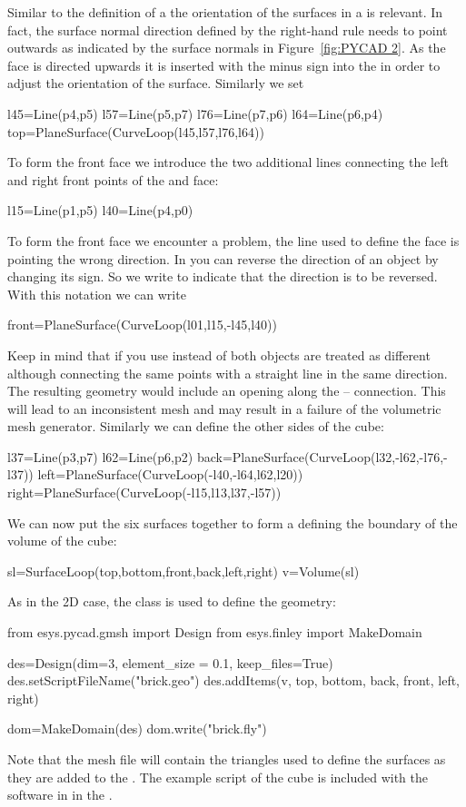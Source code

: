Similar to the definition of a  the orientation of the
surfaces in a  is relevant.
In fact, the surface normal direction defined by the right-hand rule needs to
point outwards as indicated by the surface normals in Figure~\ref{fig:PYCAD 2}.
As the  face is directed upwards it is inserted with the minus
sign into the  in order to adjust the orientation of the
surface. Similarly we set 
\begin{python}
  l45=Line(p4,p5)
  l57=Line(p5,p7)
  l76=Line(p7,p6)
  l64=Line(p6,p4)
  top=PlaneSurface(CurveLoop(l45,l57,l76,l64))
\end{python}
To form the front face we introduce the two additional lines connecting the
left and right front points of the  and  face:
\begin{python}
  l15=Line(p1,p5)
  l40=Line(p4,p0)
\end{python}
To form the front face we encounter a problem, the line  used
to define the  face is pointing the wrong direction.
In \pycad you can reverse the direction of an object by changing its sign.
So we write  to indicate that the direction is to be reversed.
With this notation we can write
\begin{python}
  front=PlaneSurface(CurveLoop(l01,l15,-l45,l40))
\end{python}
Keep in mind that if you use  instead of  both
objects are treated as different although connecting the same points with a
straight line in the same direction. The resulting geometry would include an
opening along the -- connection.
This will lead to an inconsistent mesh and may result in a failure of the
volumetric mesh generator. Similarly we can define the other sides of the cube:
\begin{python}
  l37=Line(p3,p7)
  l62=Line(p6,p2)
  back=PlaneSurface(CurveLoop(l32,-l62,-l76,-l37))
  left=PlaneSurface(CurveLoop(-l40,-l64,l62,l20))
  right=PlaneSurface(CurveLoop(-l15,l13,l37,-l57))
\end{python}
We can now put the six surfaces together to form a 
defining the boundary of the volume of the cube:
\begin{python}
  sl=SurfaceLoop(top,bottom,front,back,left,right)
  v=Volume(sl)
\end{python}
As in the 2D case, the  class is used to define the geometry:
\begin{python}
  from esys.pycad.gmsh import Design
  from esys.finley import MakeDomain

  des=Design(dim=3, element_size = 0.1, keep_files=True)
  des.setScriptFileName("brick.geo")
  des.addItems(v, top, bottom, back, front, left, right)

  dom=MakeDomain(des)
  dom.write("brick.fly")
\end{python}
Note that the \finley mesh file  will contain the
triangles used to define the surfaces as they are added to the .
The example script of the cube is included with the software in
 in the \ExampleDirectory.

